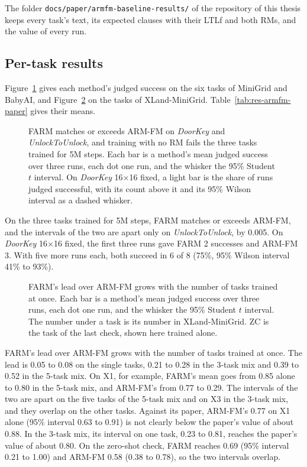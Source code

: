 \documentclass[11pt,english,listoffigures,listoftables]{tfgetsinf}
\newcommand{\env}[1]{\textsf{\slshape #1}}  %
\begin{document}
The folder \texttt{docs/paper/armfm-baseline-results/} of the repository of this thesis keeps every task's text, its expected clauses with their LTLf and both RMs, and the value of every run.

\subsection{Per-task results}

Figure~\ref{fig:res-armfm-paper} gives each method's judged success on the six tasks of MiniGrid and BabyAI, and Figure~\ref{fig:res-armfm-xland} on the tasks of XLand-MiniGrid. Table~\ref{tab:res-armfm-paper} gives their means.

\begin{figure}[!htb]
\centering

\caption[Judged success on the paper's MiniGrid tasks]{FARM matches or exceeds ARM-FM on \env{DoorKey} and \env{UnlockToUnlock}, and training with no RM fails the three tasks trained for 5M steps. Each bar is a method's mean judged success over three runs, each dot one run, and the whisker the 95\% Student $t$ interval. On \env{DoorKey} 16$\times$16 fixed, a light bar is the share of runs judged successful, with its count above it and its 95\% Wilson interval as a dashed whisker.}
\label{fig:res-armfm-paper}
\end{figure}

On the three tasks trained for 5M steps, FARM matches or exceeds ARM-FM, and the intervals of the two are apart only on \env{UnlockToUnlock}, by 0.005. On \env{DoorKey} 16$\times$16 fixed, the first three runs gave FARM 2 successes and ARM-FM 3. With five more runs each, both succeed in 6 of 8 (75\%, 95\% Wilson interval 41\% to 93\%).

\begin{figure}[!htb]
\centering

\caption[Judged success on the XLand-MiniGrid tasks]{FARM's lead over ARM-FM grows with the number of tasks trained at once. Each bar is a method's mean judged success over three runs, each dot one run, and the whisker the 95\% Student $t$ interval. The number under a task is its number in XLand-MiniGrid. ZC is the task of the last check, shown here trained alone.}
\label{fig:res-armfm-xland}
\end{figure}

FARM's lead over ARM-FM grows with the number of tasks trained at once. The lead is 0.05 to 0.08 on the single tasks, 0.21 to 0.28 in the 3-task mix and 0.39 to 0.52 in the 5-task mix. On X1, for example, FARM's mean goes from 0.85 alone to 0.80 in the 5-task mix, and ARM-FM's from 0.77 to 0.29. The intervals of the two are apart on the five tasks of the 5-task mix and on X3 in the 3-task mix, and they overlap on the other tasks. Against its paper, ARM-FM's 0.77 on X1 alone (95\% interval 0.63 to 0.91) is not clearly below the paper's value of about 0.88. In the 3-task mix, its interval on one task, 0.23 to 0.81, reaches the paper's value of about 0.80. On the zero-shot check, FARM reaches 0.69 (95\% interval 0.21 to 1.00) and ARM-FM 0.58 (0.38 to 0.78), so the two intervals overlap.
\end{document}
